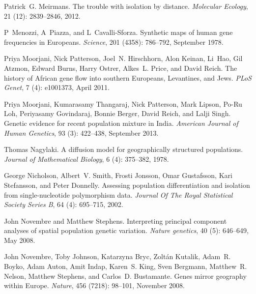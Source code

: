 \documentclass[10pt,letterpaper]{article}
\begin{document}
\begin{thebibliography}{80}
Patrick~G. Meirmans.
\newblock The trouble with isolation by distance.
\newblock \emph{Molecular Ecology}, 21 (12): 2839--2846,
  2012.

P~Menozzi, A~Piazza, and L~Cavalli-Sforza.
\newblock Synthetic maps of human gene frequencies in {Europeans}.
\newblock \emph{Science}, 201 (4358): 786--792, September
  1978.

Priya Moorjani, Nick Patterson, Joel~N. Hirschhorn, Alon Keinan, Li~Hao, Gil
  Atzmon, Edward Burns, Harry Ostrer, Alkes~L. Price, and David Reich.
\newblock The history of {African} gene flow into southern {Europeans,}
  {Levantines,} and {Jews}.
\newblock \emph{{PLoS} Genet}, 7 (4): e1001373, April 2011.

Priya Moorjani, Kumarasamy Thangaraj, Nick Patterson, Mark Lipson, Po-Ru Loh,
  Periyasamy Govindaraj, Bonnie Berger, David Reich, and Lalji Singh.
\newblock Genetic evidence for recent population mixture in {India}.
\newblock \emph{American Journal of Human Genetics}, 93 (3):
  422--438, September 2013.

Thomas Nagylaki.
\newblock A diffusion model for geographically structured populations.
\newblock \emph{Journal of Mathematical Biology}, 6 (4):
  375--382, 1978.

George Nicholson, Albert~V. Smith, Frosti Jonsson, Omar Gustafsson, Kari
  Stefansson, and Peter Donnelly.
\newblock Assessing population differentiation and isolation from
  single-nucleotide polymorphism data.
\newblock \emph{Journal Of The Royal Statistical Society Series B}, 64
  (4): 695--715, 2002.

John Novembre and Matthew Stephens.
\newblock Interpreting principal component analyses of spatial population
  genetic variation.
\newblock \emph{Nature genetics}, 40 (5): 646--649, May 2008.

John Novembre, Toby Johnson, Katarzyna Bryc, Zoltán Kutalik, Adam~R. Boyko,
  Adam Auton, Amit Indap, Karen~S. King, Sven Bergmann, Matthew~R. Nelson,
  Matthew Stephens, and Carlos~D. Bustamante.
\newblock Genes mirror geography within {Europe}.
\newblock \emph{Nature}, 456 (7218): 98--101, November 2008.


\end{thebibliography}
\end{document}

